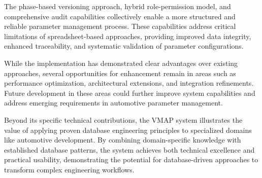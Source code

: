 The phase-based versioning approach, hybrid role-permission model, and comprehensive audit capabilities collectively enable a more structured and reliable parameter management process. These capabilities address critical limitations of spreadsheet-based approaches, providing improved data integrity, enhanced traceability, and systematic validation of parameter configurations.

While the implementation has demonstrated clear advantages over existing approaches, several opportunities for enhancement remain in areas such as performance optimization, architectural extensions, and integration refinements. Future development in these areas could further improve system capabilities and address emerging requirements in automotive parameter management.

Beyond its specific technical contributions, the VMAP system illustrates the value of applying proven database engineering principles to specialized domains like automotive development. By combining domain-specific knowledge with established database patterns, the system achieves both technical excellence and practical usability, demonstrating the potential for database-driven approaches to transform complex engineering workflows.